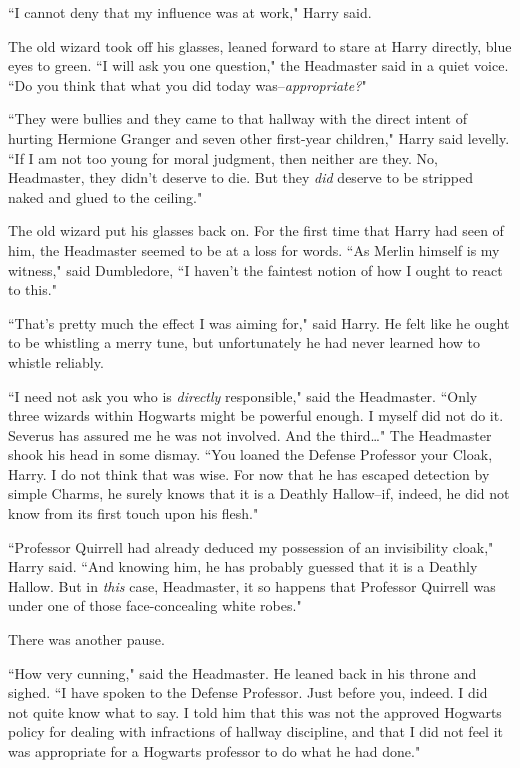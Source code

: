``I cannot deny that my influence was at work," Harry said.

The old wizard took off his glasses, leaned forward to stare at Harry directly, blue eyes to green. ``I will ask you one question," the Headmaster said in a quiet voice. ``Do you think that what you did today was\---\emph{appropriate?}"

``They were bullies and they came to that hallway with the direct intent of hurting Hermione Granger and seven other first-year children," Harry said levelly. ``If I am not too young for moral judgment, then neither are they. No, Headmaster, they didn't deserve to die. But they \emph{did} deserve to be stripped naked and glued to the ceiling."

The old wizard put his glasses back on. For the first time that Harry had seen of him, the Headmaster seemed to be at a loss for words. ``As Merlin himself is my witness," said Dumbledore, ``I haven't the faintest notion of how I ought to react to this."

``That's pretty much the effect I was aiming for," said Harry. He felt like he ought to be whistling a merry tune, but unfortunately he had never learned how to whistle reliably.

``I need not ask you who is \emph{directly} responsible," said the Headmaster. ``Only three wizards within Hogwarts might be powerful enough. I myself did not do it. Severus has assured me he was not involved. And the third{\ldots}" The Headmaster shook his head in some dismay. ``You loaned the Defense Professor your Cloak, Harry. I do not think that was wise. For now that he has escaped detection by simple Charms, he surely knows that it is a Deathly Hallow\---if, indeed, he did not know from its first touch upon his flesh."

``Professor Quirrell had already deduced my possession of an invisibility cloak," Harry said. ``And knowing him, he has probably guessed that it is a Deathly Hallow. But in \emph{this} case, Headmaster, it so happens that Professor Quirrell was under one of those face-concealing white robes."

There was another pause.

``How very cunning," said the Headmaster. He leaned back in his throne and sighed. ``I have spoken to the Defense Professor. Just before you, indeed. I did not quite know what to say. I told him that this was not the approved Hogwarts policy for dealing with infractions of hallway discipline, and that I did not feel it was appropriate for a Hogwarts professor to do what he had done."

